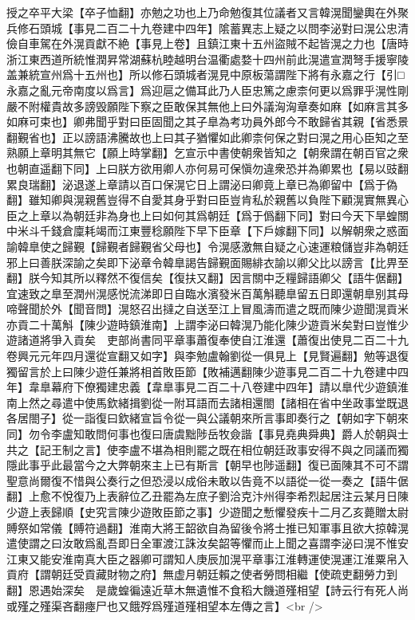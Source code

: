 授之卒平大梁【卒子恤翻】亦勉之功也上乃命勉復其位議者又言韓滉聞鑾輿在外聚兵修石頭城【事見二百二十九卷建中四年】隂蓄異志上疑之以問李泌對曰滉公忠清儉自車駕在外滉貢獻不絶【事見上卷】且鎮江東十五州盜賊不起皆滉之力也【唐時浙江東西道所統惟潤昇常湖蘇杭睦越明台温衢處婺十四州前此滉遣宣潤弩手援寧陵盖兼統宣州爲十五州也】所以修石頭城者滉見中原板蕩謂陛下將有永嘉之行【引□永嘉之亂元帝南度以爲言】爲迎扈之備耳此乃人臣忠篤之慮柰何更以爲罪乎滉性剛嚴不附權貴故多謗毁願陛下察之臣敢保其無他上曰外議洶洶章奏如麻【如麻言其多如麻可束也】卿弗聞乎對曰臣固聞之其子臯為考功員外郎今不敢歸省其親【省悉景翻覲省也】正以謗語沸騰故也上曰其子猶懼如此卿柰何保之對曰滉之用心臣知之至熟願上章明其無它【願上時掌翻】乞宣示中書使朝衆皆知之【朝衆謂在朝百官之衆也朝直遥翻下同】上曰朕方欲用卿人亦何易可保愼勿違衆恐并為卿累也【易以豉翻累良瑞翻】泌退遂上章請以百口保滉它日上謂泌曰卿竟上章已為卿留中【爲于偽翻】雖知卿與滉親舊豈得不自愛其身乎對曰臣豈肯私於親舊以負陛下顧滉實無異心臣之上章以為朝廷非為身也上曰如何其爲朝廷【爲于僞翻下同】對曰今天下旱蝗關中米斗千錢倉廩耗竭而江東豐稔願陛下早下臣章【下戶嫁翻下同】以解朝衆之惑面諭韓臯使之歸覲【歸覲者歸覲省父母也】令滉感激無自疑之心速運粮儲豈非為朝廷邪上曰善朕深諭之矣即下泌章令韓臯謁告歸覲面賜緋衣諭以卿父比以謗言【比畀至翻】朕今知其所以釋然不復信矣【復扶又翻】因言關中乏糧歸語卿父【語牛倨翻】宜速致之臯至潤州滉感悦流涕即日自臨水濱發米百萬斛聽臯留五日即還朝臯别其母啼聲聞於外【聞音問】滉怒召出撻之自送至江上冒風濤而遣之既而陳少遊聞滉貢米亦貢二十萬斛【陳少遊時鎮淮南】上謂李泌曰韓滉乃能化陳少遊貢米矣對曰豈惟少遊諸道將爭入貢矣　吏部尚書同平章事蕭復奉使自江淮還【蕭復出使見二百二十九卷興元元年四月還從宣翻又如字】與李勉盧翰劉從一俱見上【見賢遍翻】勉等退復獨留言於上曰陳少遊任兼將相首敗臣節【敗補邁翻陳少遊事見二百二十九卷建中四年】韋臯幕府下僚獨建忠義【韋臯事見二百二十八卷建中四年】請以臯代少遊鎮淮南上然之尋遣中使馬欽緒揖劉從一附耳語而去諸相還閤【諸相在省中坐政事堂既退各居閤子】從一詣復曰欽緒宣旨令從一與公議朝來所言事即奏行之【朝如字下朝來同】勿令李盧知敢問何事也復曰唐虞黜陟岳牧僉諧【事見堯典舜典】爵人於朝與士共之【記王制之言】使李盧不堪為相則罷之既在相位朝廷政事安得不與之同議而獨隱此事乎此最當今之大弊朝來主上已有斯言【朝早也陟遥翻】復已面陳其不可不謂聖意尚爾復不惜與公奏行之但恐浸以成俗未敢以告竟不以語從一從一奏之【語牛倨翻】上愈不悅復乃上表辭位乙丑罷為左庶子劉洽克汴州得李希烈起居注云某月日陳少遊上表歸順【史究言陳少遊敗臣節之事】少遊聞之慙懼發疾十二月乙亥薨贈太尉賻祭如常儀【賻符過翻】淮南大將王韶欲自為留後令將士推已知軍事且欲大掠韓滉遣使謂之曰汝敢爲亂吾即日全軍渡江誅汝矣韶等懼而止上聞之喜謂李泌曰滉不惟安江東又能安淮南真大臣之器卿可謂知人庚辰加滉平章事江淮轉運使滉運江淮粟帛入貢府【謂朝廷受貢藏財物之府】無虚月朝廷賴之使者勞問相繼【使疏吏翻勞力到翻】恩遇始深矣　是歲蝗徧遠近草木無遺惟不食稻大饑道殣相望【詩云行有死人尚或殣之殣渠吝翻瘞尸也又餓殍爲殣道殣相望本左傳之言】<br />
